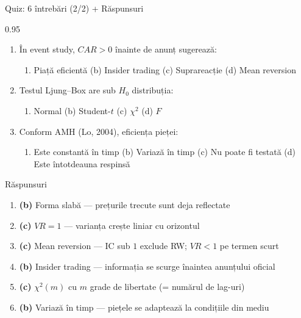 \documentclass[9pt, aspectratio=169, t]{beamer}
\begin{document}
\begin{frame}[shrink=15]{Quiz: 6 întrebări (2/2) + Răspunsuri}
\begin{cminipage}{0.95\textwidth}
\small
\begin{enumerate}\setlength{\itemsep}{0pt}
    \setcounter{enumi}{3}
    \item În event study, $CAR > 0$ înainte de anunț sugerează:
    \begin{enumerate}\setlength{\itemsep}{0pt}
        \item[(a)] Piață eficientă \quad (b) Insider trading \quad (c) Suprareacție \quad (d) Mean reversion
    \end{enumerate}

    \vspace{0.1cm}
    \item Testul Ljung--Box are sub $H_0$ distribuția:
    \begin{enumerate}\setlength{\itemsep}{0pt}
        \item[(a)] Normal \quad (b) Student-$t$ \quad (c) $\chi^2$ \quad (d) $F$
    \end{enumerate}

    \vspace{0.1cm}
    \item Conform AMH (Lo, 2004), eficiența pieței:
    \begin{enumerate}\setlength{\itemsep}{0pt}
        \item[(a)] Este constantă în timp \quad (b) Variază în timp \quad (c) Nu poate fi testată \quad (d) Este întotdeauna respinsă
    \end{enumerate}
\end{enumerate}

\vspace{0.1cm}
\begin{exampleblock}{Răspunsuri}
\small
\begin{enumerate}\setlength{\itemsep}{0pt}
    \item \textbf{(b)} Forma slabă --- prețurile trecute sunt deja reflectate
    \item \textbf{(c)} $VR = 1$ --- varianța crește liniar cu orizontul
    \item \textbf{(c)} Mean reversion --- IC sub $1$ exclude RW; $VR < 1$ pe termen scurt
    \item \textbf{(b)} Insider trading --- informația se scurge înaintea anunțului oficial
    \item \textbf{(c)} $\chi^2(m)$ cu $m$ grade de libertate (= numărul de lag-uri)
    \item \textbf{(b)} Variază în timp --- piețele se adaptează la condițiile din mediu
\end{enumerate}
\end{exampleblock}
\end{cminipage}
\end{frame}
\end{document}
